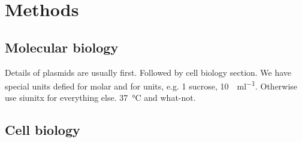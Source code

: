 \section*{Methods}\label{s:methods}

\subsection*{Molecular biology}

Details of plasmids are usually first.
Followed by cell biology section.
We have special units defied for molar and for units, e.g. \SI{1}{\Molar} sucrose, \SI{10}{\Units\per\milli\litre}.
Otherwise use siunitx for everything else. \SI{37}{\degreeCelsius} and what-not.

\subsection*{Cell biology}

\lipsum[80]

